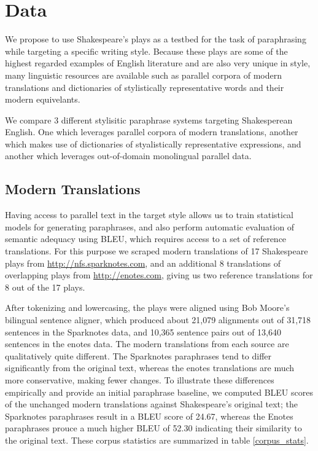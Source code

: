 \documentclass[10pt,a5paper,twoside]{article}
\begin{document}
\section{Data}
We propose to use Shakespeare's plays as a testbed for the task of paraphrasing while targeting a specific writing style.  Because these plays are some of the
highest regarded examples of English literature and are also very unique in style, many linguistic resources are available such as parallel corpora
of modern translations and dictionaries of stylistically representative words and their modern equivelants.

We compare 3 different stylisitic paraphrase systems targeting Shakesperean English.  One which leverages parallel corpora of modern translations, another which makes use
of dictionaries of styalistically representative expressions, and another which leverages out-of-domain monolingual parallel data.

\subsection{Modern Translations}
Having access to parallel text in the target style allows us to train statistical models for generating paraphrases, and also perform automatic evaluation of semantic adequacy using BLEU, which requires access to a set of reference translations.  For this purpose we scraped modern translations of 17 Shakespeare plays from \url{http://nfs.sparknotes.com}, and an additional 8 translations of overlapping plays from \url{http://enotes.com}, giving us two reference translations for 8 out of the 17 plays.

After tokenizing and lowercasing, the plays were aligned using Bob Moore's bilingual sentence \cite{Moore02} aligner, which produced about 21,079 alignments out of 31,718 sentences in the Sparknotes data, and 10,365 sentence pairs out of 13,640 sentences in the enotes data.  The modern translations from each source are qualitatively quite
different.  The Sparknotes paraphrases tend to differ significantly from the original text, whereas the enotes translations are much more conservative, making fewer changes.
To illustrate these differences empirically and provide an initial paraphrase baseline, we computed BLEU scores of the unchanged modern translations against Shakespeare's 
original text; the Sparknotes paraphrases result in a BLEU score of 24.67, whereas the Enotes paraphrases prouce a much higher BLEU of 52.30 indicating their similarity to the original text.
These corpus statistics are summarized in table \ref{corpus_stats}.
\end{document}
